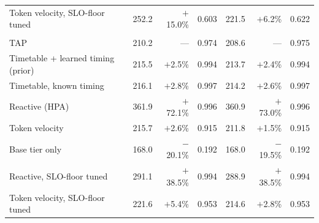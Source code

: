 \begin{table}[t]
\begin{tabular}{@{}lrrrrrr@{}}
    Token velocity, SLO-floor tuned & 252.2 & $+$15.0\% & 0.603 & 221.5 & $+$6.2\% & 0.622 \\
    \addlinespace
    \multicolumn{7}{@{}l}{\emph{72B (c3), replica tier}} \\
    TAP & 210.2 & --- & 0.974 & 208.6 & --- & 0.975 \\
    Timetable + learned timing (prior) & 215.5 & $+$2.5\% & 0.994 & 213.7 & $+$2.4\% & 0.994 \\
    Timetable, known timing & 216.1 & $+$2.8\% & 0.997 & 214.2 & $+$2.6\% & 0.997 \\
    Reactive (HPA) & 361.9 & $+$72.1\% & 0.996 & 360.9 & $+$73.0\% & 0.996 \\
    Token velocity & 215.7 & $+$2.6\% & 0.915 & 211.8 & $+$1.5\% & 0.915 \\
    Base tier only & 168.0 & $-$20.1\% & 0.192 & 168.0 & $-$19.5\% & 0.192 \\
    Reactive, SLO-floor tuned & 291.1 & $+$38.5\% & 0.994 & 288.9 & $+$38.5\% & 0.994 \\
    Token velocity, SLO-floor tuned & 221.6 & $+$5.4\% & 0.953 & 214.6 & $+$2.8\% & 0.953 \\
    \bottomrule
  \end{tabular}
\end{table}

